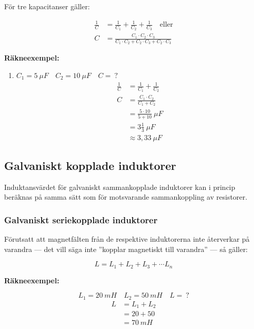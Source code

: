 För tre kapacitanser gäller:

\begin{align*}
  \frac{1}{C} &= \frac{1}{C_1} + \frac{1}{C_2} + \frac{1}{C_3}
  \quad \text{eller} \\
  C &= \frac{C_1 \cdot C_2 \cdot C_3}
  {C_1 \cdot C_2 + C_2 \cdot C_3 + C_2 \cdot C_3}
\end{align*}

\textbf{Räkneexempel:}

\begin{enumerate}
  \item \(C_1 = 5\ \mu F \quad C_2 = 10\ \mu F \quad C =\ ?\)
    \begin{align*}
      \frac{1}{C} &= \frac{1}{C_1} + \frac{1}{C_2} \\
      C &= \frac{C_1 \cdot C_2}{C_1 + C_2} \\
      &= \frac{5 \cdot 10}{5 + 10}\ \mu F \\
      &= 3\frac{1}{3}\ \mu F \\
      &\approx 3,33\ \mu F
    \end{align*}
\end{enumerate}

\subsection{Galvaniskt kopplade induktorer}

Induktansvärdet för galvaniskt sammankopplade induktorer kan i princip
beräknas på samma sätt som för motsvarande sammankoppling av resistorer.

\subsubsection{Galvaniskt seriekopplade induktorer}

Förutsatt att magnetfälten från de respektive induktorerna inte
återverkar på varandra --- det vill säga inte ''kopplar magnetiskt
till varandra'' --- så gäller:

\[L = L_1 + L_2 + L_3 + \cdots L_n\]

\textbf{Räkneexempel:}

\[L_1 = 20\ mH \quad L_2 = 50\ mH \quad L =\ ?\]
\begin{align*}
  L &= L_1 + L_2 \\
  & = 20 + 50 \\
  &= 70\ mH
\end{align*}

